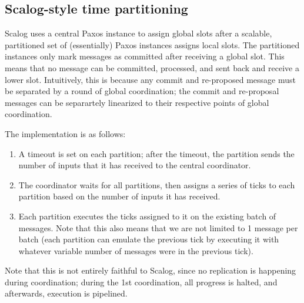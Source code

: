 \documentclass{article}
\begin{document}
\subsection{Scalog-style time partitioning}
Scalog uses a central Paxos instance to assign global slots after a scalable, partitioned set of (essentially) Paxos instances assigns local slots.
The partitioned instances only mark messages as committed after receiving a global slot.
This means that no message can be committed, processed, and sent back and receive a lower slot.
Intuitively, this is because any commit and re-proposed message must be separated by a round of global coordination; the commit and re-proposal messages can be separartely linearized to their respective points of global coordination.

The implementation is as follows:
\begin{enumerate}
  \item A timeout is set on each partition; after the timeout, the partition sends the number of inputs that it has received to the central coordinator.
  \item The coordinator waits for all partitions, then assigns a series of ticks to each partition based on the number of inputs it has received.
  \item Each partition executes the ticks assigned to it on the existing batch of messages. Note that this also means that we are not limited to 1 message per batch (each partition can emulate the previous tick by executing it with whatever variable number of messages were in the previous tick).
\end{enumerate}

Note that this is not entirely faithful to Scalog, since no replication is happening during coordination; during the 1st coordination, all progress is halted, and afterwards, execution is pipelined.
\end{document}
